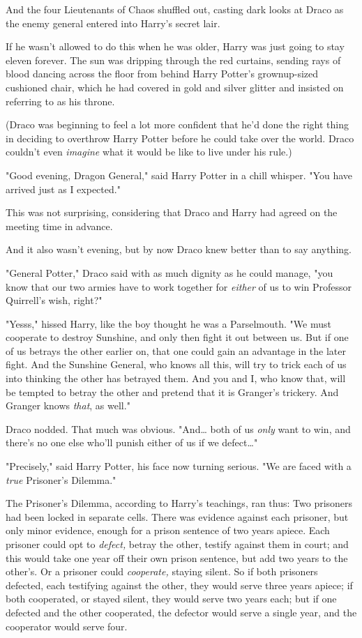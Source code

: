 And the four Lieutenants of Chaos shuffled out, casting dark looks at Draco as 
the enemy general entered into Harry's secret lair.

If he wasn't allowed to do this when he was older, Harry was just going to stay 
eleven forever.
\sbreak
The sun was dripping through the red curtains, sending rays of blood dancing 
across the floor from behind Harry Potter's grownup-sized cushioned chair, 
which he had covered in gold and silver glitter and insisted on referring to as 
his throne.

(Draco was beginning to feel a lot more confident that he'd done the right 
thing in deciding to overthrow Harry Potter before he could take over the 
world. Draco couldn't even \emph{imagine} what it would be like to live under 
his rule.)

"Good evening, Dragon General," said Harry Potter in a chill whisper. "You have 
arrived just as I expected."

This was not surprising, considering that Draco and Harry had agreed on the 
meeting time in advance.

And it also wasn't evening, but by now Draco knew better than to say anything.

"General Potter," Draco said with as much dignity as he could manage, "you know 
that our two armies have to work together for \emph{either} of us to win 
Professor Quirrell's wish, right?"

"Yesss," hissed Harry, like the boy thought he was a Parselmouth. "We must 
cooperate to destroy Sunshine, and only then fight it out between us. But if 
one of us betrays the other earlier on, that one could gain an advantage in the 
later fight. And the Sunshine General, who knows all this, will try to trick 
each of us into thinking the other has betrayed them. And you and I, who know 
that, will be tempted to betray the other and pretend that it is Granger's 
trickery. And Granger knows \emph{that}, as well."

Draco nodded. That much was obvious. "And{\ldots} both of us \emph{only} want 
to win, and there's no one else who'll punish either of us if we defect{\ldots}"

"Precisely," said Harry Potter, his face now turning serious. "We are faced 
with a \emph{true} Prisoner's Dilemma."

The Prisoner's Dilemma, according to Harry's teachings, ran thus: Two prisoners 
had been locked in separate cells. There was evidence against each prisoner, 
but only minor evidence, enough for a prison sentence of two years apiece. Each 
prisoner could opt to \emph{defect,} betray the other, testify against them in 
court; and this would take one year off their own prison sentence, but add two 
years to the other's. Or a prisoner could \emph{cooperate,} staying silent. So 
if both prisoners defected, each testifying against the other, they would serve 
three years apiece; if both cooperated, or stayed silent, they would serve two 
years each; but if one defected and the other cooperated, the defector would 
serve a single year, and the cooperator would serve four.

